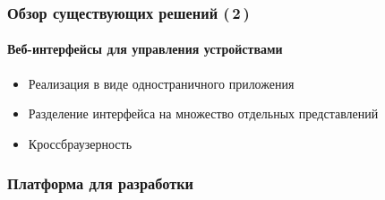 \documentclass[xetex,с,aspectratio=169]{beamer}
\begin{document}
%
%
{

  \begin{frame}
    \frametitle{Обзор существующих решений (\,2\,)}
    \framesubtitle{Веб-интерфейсы для управления устройствами}
    \vskip 1cm
    \begin{minipage}{\textwidth}
      \flushright

      \begin{minipage}[c]{.55\textwidth}
        \begin{itemize}
          \setlength\itemsep{0.5em}
          \item Реализация в виде одностраничного приложения
          \item Разделение интерфейса на множество отдельных представлений
          \item Кроссбраузерность
        \end{itemize}
      \end{minipage}
    \end{minipage}
  \end{frame}
}

%
%
{

  \begin{frame}
    \frametitle{Платформа для разработки}
  \end{frame}
}
\end{document}
